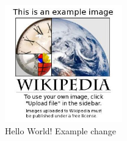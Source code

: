 \begin{figure}
\includegraphics[width=2in]{img/Example.jpg}
\caption{Hello World! Example change}
\label{fig:example}
\end{figure}
